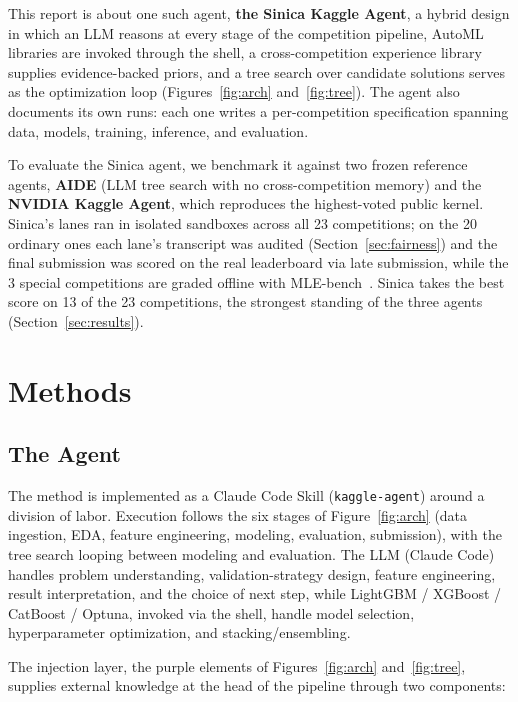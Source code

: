 \documentclass[11pt,a4paper]{article}
\begin{document}
This report is about one such agent, \textbf{the Sinica Kaggle Agent}, a hybrid design in which an LLM reasons at every stage of the competition pipeline, AutoML libraries are invoked through the shell, a cross-competition experience library supplies evidence-backed priors, and a tree search over candidate solutions serves as the optimization loop (Figures~\ref{fig:arch} and~\ref{fig:tree}). The agent also documents its own runs: each one writes a per-competition specification spanning data, models, training, inference, and evaluation.

To evaluate the Sinica agent, we benchmark it against two frozen reference agents, \textbf{AIDE} (LLM tree search with no cross-competition memory) and the \textbf{NVIDIA Kaggle Agent}, which reproduces the highest-voted public kernel. Sinica's lanes ran in isolated sandboxes across all 23 competitions; on the 20 ordinary ones each lane's transcript was audited (Section~\ref{sec:fairness}) and the final submission was scored on the real leaderboard via late submission, while the 3 special competitions are graded offline with MLE-bench~\cite{mlebench}. Sinica takes the best score on 13 of the 23 competitions, the strongest standing of the three agents (Section~\ref{sec:results}).

\section{Methods}

\subsection{The Agent}
\label{sec:v5}

The method is implemented as a Claude Code Skill (\texttt{kaggle-agent}) around a division of labor. Execution follows the six stages of Figure~\ref{fig:arch} (data ingestion, EDA, feature engineering, modeling, evaluation, submission), with the tree search looping between modeling and evaluation. The LLM (Claude Code) handles problem understanding, validation-strategy design, feature engineering, result interpretation, and the choice of next step, while LightGBM / XGBoost / CatBoost / Optuna, invoked via the shell, handle model selection, hyperparameter optimization, and stacking/ensembling.

\medskip
\noindent The injection layer, the purple elements of Figures~\ref{fig:arch} and~\ref{fig:tree}, supplies external knowledge at the head of the pipeline through two components:
\end{document}
